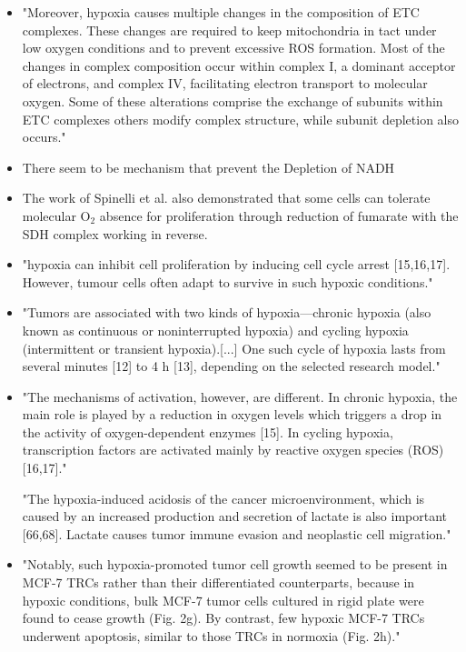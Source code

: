 \documentclass[11pt,a4paper]{article}
\begin{document}
\begin{itemize}
\item "Moreover, hypoxia causes multiple changes in the composition of ETC complexes. These changes are required to keep mitochondria in tact under low oxygen conditions and to prevent excessive ROS formation. Most of the changes in complex composition occur within complex I, a dominant acceptor of electrons, and complex IV, facilitating electron transport to molecular oxygen. Some of these alterations comprise the exchange of subunits within ETC complexes others modify complex structure, while subunit depletion also occurs." \cite{Fuhrmann2017}

\item There seem to be mechanism that prevent the Depletion of NADH \cite{Yan2020}

\item The work of Spinelli et al. also demonstrated that some cells can tolerate molecular O$_{2}$ absence for proliferation through reduction of fumarate with the SDH complex working in reverse. \cite{Spinelli2021}

\item "hypoxia can inhibit cell proliferation by inducing cell cycle arrest [15,16,17]. However, tumour cells often adapt to survive in such hypoxic conditions." \cite{Druker2021}

\item "Tumors are associated with two kinds of hypoxia—chronic hypoxia (also known as continuous or noninterrupted hypoxia) and cycling hypoxia (intermittent or transient hypoxia).[...]  One such cycle of hypoxia lasts from several minutes [12] to 4 h [13], depending on the selected research model."\cite{Korbecki2021}

\item "The mechanisms of activation, however, are different. In chronic hypoxia, the main role is played by a reduction in oxygen levels which triggers a drop in the activity of oxygen-dependent enzymes [15]. In cycling hypoxia, transcription factors are activated mainly by reactive oxygen species (ROS) [16,17]."\cite{Korbecki2021}

"The hypoxia-induced acidosis of the cancer microenvironment, which is caused by an increased production and secretion of lactate is also important [66,68]. Lactate causes tumor immune evasion and neoplastic cell migration."\cite{Korbecki2021}

\item "Notably, such hypoxia-promoted tumor cell growth seemed to be present in MCF-7 TRCs rather than their differentiated counterparts, because in hypoxic conditions, bulk MCF-7 tumor cells cultured in rigid plate were found to cease growth (Fig. 2g). By contrast, few hypoxic MCF-7 TRCs underwent apoptosis, similar to those TRCs in normoxia (Fig. 2h)." \cite{Tang2019}


\end{itemize}
\end{document}
